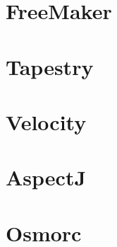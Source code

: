 \chapter{FreeMaker}


\chapter{Tapestry}



\chapter{Velocity}



\chapter{AspectJ}



\chapter{Osmorc}






